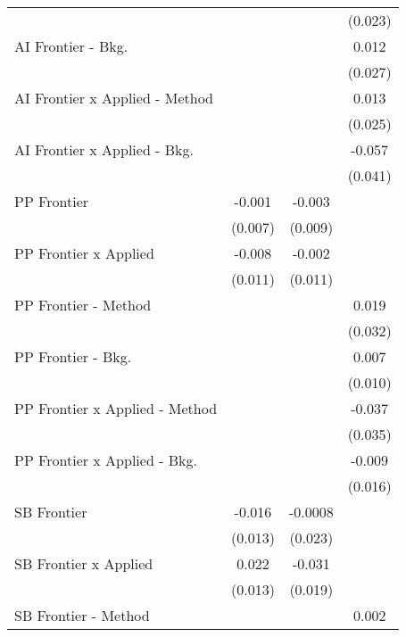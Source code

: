 \begin{tabular}{lccc}
                                  &               &         & (0.023)\\   
   AI Frontier - Bkg.             &               &         & 0.012\\   
                                  &               &         & (0.027)\\   
   AI Frontier x Applied - Method &               &         & 0.013\\   
                                  &               &         & (0.025)\\   
   AI Frontier x Applied - Bkg.   &               &         & -0.057\\   
                                  &               &         & (0.041)\\   
   PP Frontier                    & -0.001        & -0.003  &   \\   
                                  & (0.007)       & (0.009) &   \\   
   PP Frontier x Applied          & -0.008        & -0.002  &   \\   
                                  & (0.011)       & (0.011) &   \\   
   PP Frontier - Method           &               &         & 0.019\\   
                                  &               &         & (0.032)\\   
   PP Frontier - Bkg.             &               &         & 0.007\\   
                                  &               &         & (0.010)\\   
   PP Frontier x Applied - Method &               &         & -0.037\\   
                                  &               &         & (0.035)\\   
   PP Frontier x Applied - Bkg.   &               &         & -0.009\\   
                                  &               &         & (0.016)\\   
   SB Frontier                    & -0.016        & -0.0008 &   \\   
                                  & (0.013)       & (0.023) &   \\   
   SB Frontier x Applied          & 0.022         & -0.031  &   \\   
                                  & (0.013)       & (0.019) &   \\   
   SB Frontier - Method           &               &         & 0.002\\   

\end{tabular}
